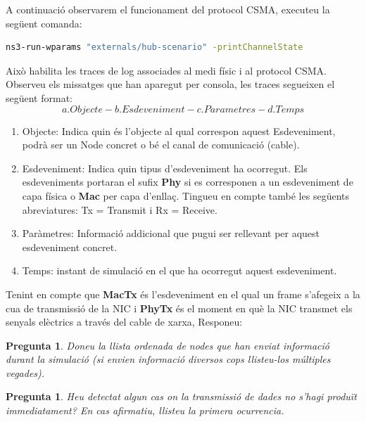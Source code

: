 \documentclass[12pt,a4paper]{article}
\newcounter{exercises}
\newtheorem{exer}[exercises]{Pregunta}
\begin{document}
\begin{enumerate}
A continuació observarem el funcionament del protocol CSMA, executeu la següent comanda:

\begin{lstlisting}[language=bash,basicstyle=\footnotesize]
   ns3-run-wparams "externals/hub-scenario" -printChannelState
\end{lstlisting}
Això habilita les traces de log associades al medi físic i al protocol CSMA. Observeu els missatges que han aparegut per consola, les traces segueixen el següent format:
$$
a. Objecte  - b. Esdeveniment - c. Parametres - d. Temps $$

\begin{enumerate}
\item Objecte: Indica quin és l'objecte al qual correspon aquest Esdeveniment, podrà ser un Node concret o bé el canal de comunicació (cable).
\item Esdeveniment: Indica quin tipus d'esdeveniment ha ocorregut. Els esdeveniments portaran el sufix \textbf{Phy} si es corresponen a un esdeveniment de capa física o \textbf{Mac} per capa d'enllaç. Tingueu en compte també les següents abreviatures: Tx = Transmit i Rx = Receive.
\item Paràmetres: Informació addicional que pugui ser rellevant per aquest esdeveniment concret.
\item Temps: instant de simulació en el que ha ocorregut aquest esdeveniment.
\end{enumerate}

Tenint en compte que \textbf{MacTx} és l'esdeveniment en el qual un frame s'afegeix a la cua de transmissió de la NIC i \textbf{PhyTx} és el moment en què la NIC transmet els senyals elèctrics a través del cable de xarxa, Responeu:
\begin{exer} Doneu la llista ordenada de nodes que han enviat informació durant la simulació (si envien informació diversos cops llisteu-los múltiples vegades). \end{exer}
\begin{exer} Heu detectat algun cas on la transmissió de dades no s'hagi produït immediatament? En cas afirmatiu, llisteu la primera ocurrencia. \end{exer}
\end{enumerate}
\end{document}
